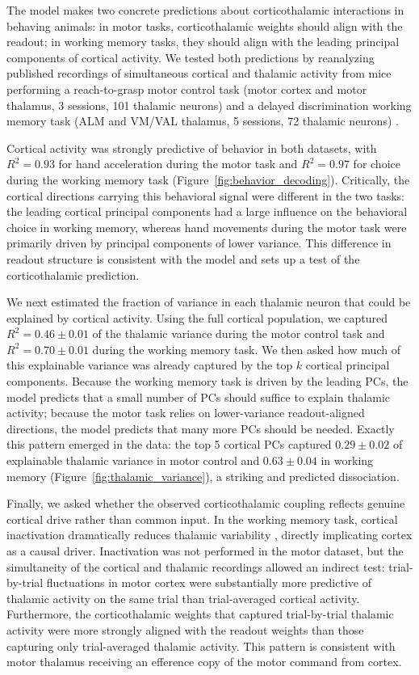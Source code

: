 \documentclass[11pt]{article}
\begin{document}
The model makes two concrete predictions about corticothalamic
interactions in behaving animals: in motor tasks, corticothalamic
weights should align with the readout; in working memory tasks, they
should align with the leading principal components of cortical
activity. We tested both predictions by reanalyzing published
recordings of simultaneous cortical and thalamic activity from mice
performing a reach-to-grasp motor control task (motor cortex and motor
thalamus, 3 sessions, 101 thalamic neurons)
\cite{sauerbrei2020cortical} and a delayed discrimination working
memory task (ALM and VM/VAL thalamus, 5 sessions, 72 thalamic
neurons) \cite{guo2017maintenance}.

Cortical activity was strongly predictive of behavior in both
datasets, with $R^2 = 0.93$ for hand acceleration during the motor
task and $R^2 = 0.97$ for choice during the working memory task
(Figure~\ref{fig:behavior_decoding}). Critically, the cortical
directions carrying this behavioral signal were different in the two
tasks: the leading cortical principal components had a large influence
on the behavioral choice in working memory, whereas hand movements
during the motor task were primarily driven by principal components
of lower variance. This difference in readout structure is consistent
with the model and sets up a test of the corticothalamic prediction.

We next estimated the fraction of variance in each thalamic neuron
that could be explained by cortical activity. Using the full cortical
population, we captured $R^2 = 0.46 \pm 0.01$ of the thalamic variance
during the motor control task and $R^2 = 0.70 \pm 0.01$ during the
working memory task. We then asked how much of this explainable
variance was already captured by the top $k$ cortical principal
components. Because the working memory task is driven by the leading
PCs, the model predicts that a small number of PCs should suffice to
explain thalamic activity; because the motor task relies on
lower-variance readout-aligned directions, the model predicts that
many more PCs should be needed. Exactly this pattern emerged in the
data: the top 5 cortical PCs captured $0.29 \pm 0.02$ of explainable
thalamic variance in motor control and $0.63 \pm 0.04$ in working
memory (Figure~\ref{fig:thalamic_variance}), a striking and
predicted dissociation.

Finally, we asked whether the observed corticothalamic coupling
reflects genuine cortical drive rather than common input. In the
working memory task, cortical inactivation dramatically reduces
thalamic variability \cite{guo2017maintenance}, directly implicating
cortex as a causal driver. Inactivation was not performed in the motor
dataset, but the simultaneity of the cortical and thalamic recordings
allowed an indirect test: trial-by-trial fluctuations in motor cortex
were substantially more predictive of thalamic activity on the same
trial than trial-averaged cortical activity. Furthermore, the
corticothalamic weights that captured trial-by-trial thalamic activity
were more strongly aligned with the readout weights than those
capturing only trial-averaged thalamic activity. This pattern is
consistent with motor thalamus receiving an efference copy of the
motor command from cortex.
\end{document}
